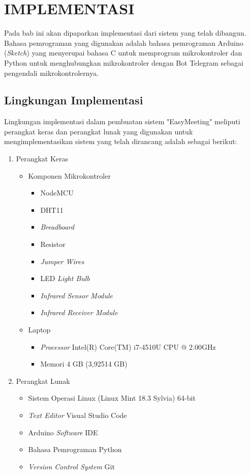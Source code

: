\chapter{IMPLEMENTASI}
\tab Pada bab ini akan dipaparkan implementasi dari sistem yang telah dibangun. Bahasa pemrograman yang digunakan adalah bahasa pemrograman Arduino (\textit{Sketch}) yang menyerupai bahasa C untuk memprogram mikrokontroler dan Python untuk menghubungkan mikrokontroler dengan Bot Telegram sebagai pengendali mikrokontrolernya.

\section{Lingkungan Implementasi}
\tab Lingkungan implementasi dalam pembuatan sistem "EasyMeeting" meliputi perangkat keras dan perangkat lunak yang digunakan untuk mengimplementasikan sistem yang telah dirancang adalah sebagai berikut:
\begin{enumerate}
	\item Perangkat Keras
	\begin{itemize}
		\item Komponen Mikrokontroler
		\begin{itemize}
			\item NodeMCU
			\item DHT11
			\item \textit{Breadboard}
			\item Resistor
			\item \textit{Jumper Wires}
			\item LED \textit{Light Bulb}
			\item \textit{Infrared Sensor Module}
			\item \textit{Infrared Receiver Module}
		\end{itemize}
		\item Laptop
		\begin{itemize}
			\item \textit{Processor} Intel(R) Core(TM) i7-4510U CPU @ 2.00GHz
			\item Memori 4 GB (3,92514 GB)
		\end{itemize}
	\end{itemize}
	\item Perangkat Lunak
	\begin{itemize}
		\item Sistem Operasi Linux (Linux Mint 18.3 Sylvia)
		 64-bit
		\item \textit{Text Editor} Visual Studio Code
		\item Arduino \textit{Software} IDE
		\item Bahasa Pemrograman Python
		\item \textit{Version Control System} Git
	\end{itemize}
\end{enumerate}

